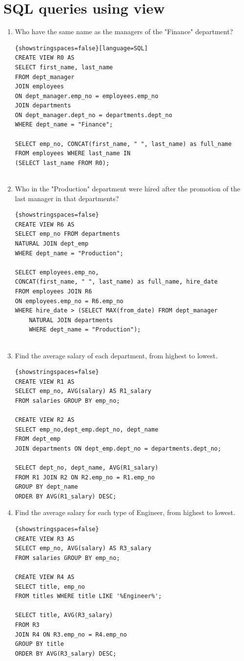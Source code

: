 \documentclass{article}
\begin{document}
\section*{SQL queries using view}
\begin{enumerate}
	\item Who have the same name as the managers of the "Finance" department?\\
	\begin{lstlisting}{showstringspaces=false}[language=SQL]
CREATE VIEW R0 AS 
SELECT first_name, last_name 
FROM dept_manager 
JOIN employees
ON dept_manager.emp_no = employees.emp_no
JOIN departments
ON dept_manager.dept_no = departments.dept_no
WHERE dept_name = "Finance";
	
SELECT emp_no, CONCAT(first_name, " ", last_name) as full_name 
FROM employees WHERE last_name IN 
(SELECT last_name FROM R0);


	\end{lstlisting}
	
	\item Who in the "Production" department were hired after the promotion of the last manager in that departments?\\
	\begin{lstlisting}{showstringspaces=false}
CREATE VIEW R6 AS 
SELECT emp_no FROM departments 
NATURAL JOIN dept_emp
WHERE dept_name = "Production";

SELECT employees.emp_no, 
CONCAT(first_name, " ", last_name) as full_name, hire_date
FROM employees JOIN R6
ON employees.emp_no = R6.emp_no
WHERE hire_date > (SELECT MAX(from_date) FROM dept_manager
	NATURAL JOIN departments
	WHERE dept_name = "Production");
 
	\end{lstlisting}
	
	\item Find the average salary of each department, from highest to lowest.	
	\begin{lstlisting}{showstringspaces=false}
CREATE VIEW R1 AS
SELECT emp_no, AVG(salary) AS R1_salary 
FROM salaries GROUP BY emp_no;

CREATE VIEW R2 AS
SELECT emp_no,dept_emp.dept_no, dept_name 
FROM dept_emp 
JOIN departments ON dept_emp.dept_no = departments.dept_no;
 
SELECT dept_no, dept_name, AVG(R1_salary)
FROM R1 JOIN R2 ON R2.emp_no = R1.emp_no
GROUP BY dept_name 
ORDER BY AVG(R1_salary) DESC;
	\end{lstlisting}
	
	\item Find the average salary for each type of Engineer, from highest to lowest.
	\begin{lstlisting}{showstringspaces=false}	
CREATE VIEW R3 AS
SELECT emp_no, AVG(salary) AS R3_salary 
FROM salaries GROUP BY emp_no; 

CREATE VIEW R4 AS
SELECT title, emp_no 
FROM titles WHERE title LIKE '%Engineer%';

SELECT title, AVG(R3_salary)
FROM R3
JOIN R4 ON R3.emp_no = R4.emp_no
GROUP BY title
ORDER BY AVG(R3_salary) DESC;
	\end{lstlisting}
		
\end{enumerate}
\end{document}
